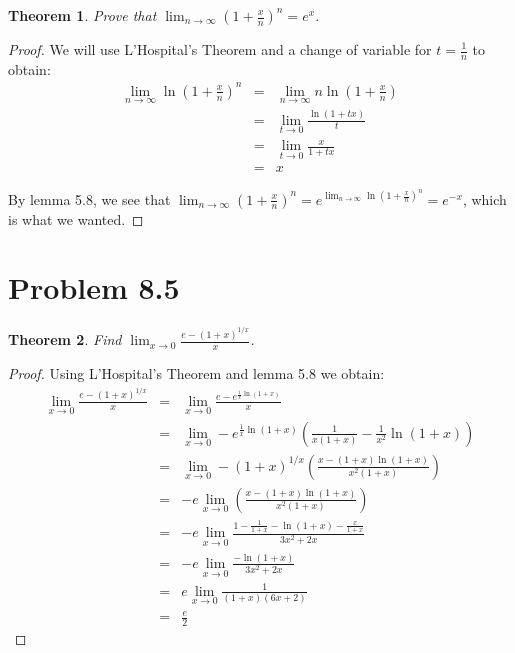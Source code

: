 \documentclass[psamsfonts]{amsart}
\newtheorem{thm}{Theorem}[section]
\theoremstyle{definition}
\theoremstyle{remark}
\numberwithin{equation}{section}
\begin{document}
\begin{thm}
Prove that $\lim_{n \to \infty} (1+ \frac{x}{n})^n = e^x$.
\end{thm}

\begin{proof}
We will use L'Hospital's Theorem and a change of variable for $t = \frac{1}{n}$ to obtain:
\begin{eqnarray}
{\lim_{n \to \infty} \ln \left(1+ \frac{x}{n} \right)^n} &=& {\lim_{n \to \infty} n \ln \left(1+ \frac{x}{n} \right)} \\
&=& \lim_{t \to 0} \frac{ \ln(1 + t x)}{t} \\
&=& \lim_{t \to 0} \frac{x}{1+tx} \\
&=& x
\end{eqnarray}

By lemma 5.8, we see that $\lim_{n \to \infty} (1+ \frac{x}{n})^n = e^{\lim_{n \to \infty} \ln(1 + \frac{x}{n})^n} = e^{-x}$, which is what we wanted. 
\end{proof}

\section{Problem 8.5}

\begin{thm}
Find $\lim_{x \to 0} \frac{ e - (1+x)^{1/x}}{x}$.
\end{thm}

\begin{proof}
Using L'Hospital's Theorem and lemma 5.8 we obtain:
\begin{eqnarray}
\lim_{x \to 0} \frac{e - (1+x)^{1/x}}{x} &=& \lim_{x \to 0} \frac{e - e^{\frac{1}{x} \ln(1+x)}}{x} \\
&=& \lim_{x \to 0} - e^{\frac{1}{x} \ln(1+x) } \left( \frac{1}{x(1+x)} - \frac{1}{x^2} \ln(1+x) \right) \\
&=& \lim_{x \to 0} - (1+x)^{1/x} \left( \frac{x - (1+x)\ln(1+x)}{x^2(1+x)} \right) \\
&=& -e \lim_{x \to 0}  \left( \frac{x - (1+x)\ln(1+x)}{x^2(1+x)} \right) \\
&=& -e \lim_{x \to 0} \frac{1 - \frac{1}{1+x} - \ln(1+x) - \frac{x}{1+x}}{3x^2 + 2x} \\
&=& -e \lim_{x \to 0} \frac{-\ln(1+x)}{3x^2 + 2x} \\
&=& e \lim_{x \to 0} \frac{1}{(1+x) (6x + 2)} \\
&=& \frac{e}{2}
\end{eqnarray}
\end{proof}
\end{document}
